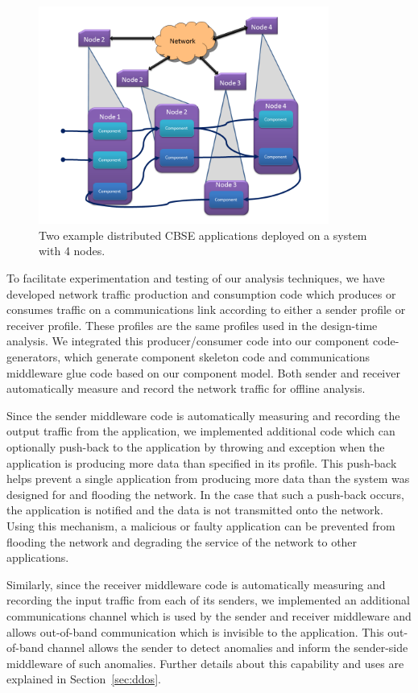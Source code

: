 \begin{figure}[ht!]
  \centering
  \includegraphics[width=0.85\textwidth]{../doc/src/images/results/cbse.png}
  \caption{Two example distributed CBSE applications deployed on a system with
    4 nodes.}
  \label{fig:cbse}
\end{figure}
   
To facilitate experimentation and testing of our analysis techniques,
we have developed network traffic production and consumption code
which produces or consumes traffic on a communications link according
to either a sender profile or receiver profile.  These profiles are
the same profiles used in the design-time analysis.  We integrated
this producer/consumer code into our component code-generators, which
generate component skeleton code and communications middleware glue
code based on our component model.  Both sender and receiver
automatically measure and record the network traffic for offline
analysis.

Since the sender middleware code is automatically measuring and
recording the output traffic from the application, we implemented
additional code which can optionally push-back to the application by
throwing and exception when the application is producing more data
than specified in its profile.  This push-back helps prevent a single
application from producing more data than the system was designed for
and flooding the network.  In the case that such a push-back occurs,
the application is notified and the data is not transmitted onto the
network.  Using this mechanism, a malicious or faulty application can
be prevented from flooding the network and degrading the service of
the network to other applications.

Similarly, since the receiver middleware code is automatically
measuring and recording the input traffic from each of its senders, we
implemented an additional communications channel which is used by the
sender and receiver middleware and allows out-of-band communication
which is invisible to the application.  This out-of-band channel
allows the sender to detect anomalies and inform the sender-side
middleware of such anomalies.  Further details about this capability
and uses are explained in Section~\ref{sec:ddos}.

